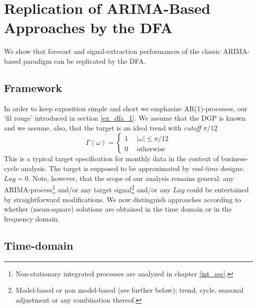 \documentclass[a4paper]{book}
\begin{document}
\section{Replication of ARIMA-Based Approaches by the DFA}\label{rep_arima}

We show that forecast and signal-extraction performances of the classic ARIMA-based paradigm can be replicated by the DFA. 



\subsection{Framework}

In order to keep exposition simple and short we emphasize AR(1)-processes, our `fil rouge' introduced in section \ref{ex_dfa_1}. We assume that the DGP is known and we assume, also, that the target is an ideal trend with \emph{cutoff} $\pi/12$
\[\Gamma(\omega)=\left\{\begin{array}{cc}1~&~|\omega|\leq \pi/12\\0~&~\textrm{otherwise}\end{array}\right.\]
This is a typical target specification for monthly data in the context of business-cycle analysis.
The target is supposed to be approximated by \emph{real-time} designs: $Lag=0$. Note, however, that the scope of our analysis remains general: any ARIMA-process\footnote{Non-stationary integrated processes are analyzed in chapter \ref{int_sec}.} and/or any target signal\footnote{Model-based or non model-based (see further below); trend, cycle, seasonal adjustment or any combination thereof.} and/or any $Lag$ could be entertained by straightforward modifications. We now distinguish approaches according to whether (mean-square) solutions are obtained in the time domain or in the frequency domain.



\subsection{Time-domain}\label{time_domain}
\end{document}
